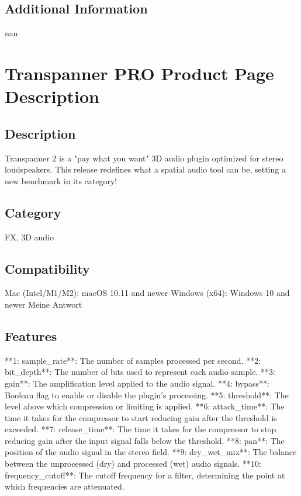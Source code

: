 \documentclass[8pt]{article}
\begin{document}
    \subsection*{Additional Information}
    nan
    

    \section*{Transpanner PRO  Product Page Description}

    \subsection*{Description}
    Transpanner 2 is a "pay what you want" 3D audio plugin optimized for stereo loudspeakers. This release redefines what a spatial audio tool can be, setting a new benchmark in its category!

    \subsection*{Category}
    FX, 3D audio

    \subsection*{Compatibility}
    Mac (Intel/M1/M2): macOS 10.11 and newer
Windows (x64): Windows 10 and newer
Meine Antwort


    \subsection*{Features}
    **1: sample_rate**: The number of samples processed per second.
**2: bit_depth**: The number of bits used to represent each audio sample.
**3: gain**: The amplification level applied to the audio signal.
**4: bypass**: Boolean flag to enable or disable the plugin’s processing.
**5: threshold**: The level above which compression or limiting is applied.
**6: attack_time**: The time it takes for the compressor to start reducing gain after the threshold is exceeded.
**7: release_time**: The time it takes for the compressor to stop reducing gain after the input signal falls below the threshold.
**8: pan**: The position of the audio signal in the stereo field.
**9: dry_wet_mix**: The balance between the unprocessed (dry) and processed (wet) audio signals.
**10: frequency_cutoff**: The cutoff frequency for a filter, determining the point at which frequencies are attenuated.
\end{document}
